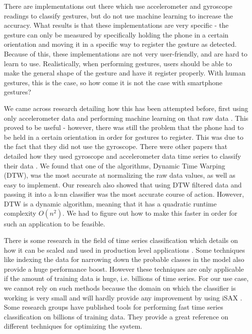 \documentclass{sigchi}
\begin{document}
There are implementations out there which use accelerometer and gyroscope readings to classify gestures, but do not use machine learning to increase the accuracy. What results is that these implementations are very specific - the gesture can only be measured by specifically holding the phone in a certain orientation and moving it in a specific way to register the gesture as detected. Because of this, these implementations are not very user-friendly, and are hard to learn to use. Realistically, when performing gestures, users should be able to make the general shape of the gesture and have it register properly. With human gestures, this is the case, so how come it is not the case with smartphone gestures?

We came across research detailing how this has been attempted before, first using only accelerometer data and performing machine learning on that raw data \cite{uwave}. This proved to be useful - however, there was still the problem that the phone had to be held in a certain orientation in order for gestures to register. This was due to the fact that they did not use the gyroscope. There were other papers that detailed how they used gyroscope and accelerometer data time series to classify their data \cite{combining-data}. We found that one of the algorithms, Dynamic Time Warping (DTW), was the most accurate at normalizing the raw data values, as well as easy to implement. Our research also showed that using DTW filtered data and passing it into a k-nn classifier was the most accurate course of action. However, DTW is a dynamic algorithm, meaning that it has a quadratic runtime complexity \(O(n^2)\). We had to figure out how to make this faster in order for such an application to be feasible. 

There is some research in the field of time series classification which details on how it can be scaled and used in production level applications \cite{scaling-dtw}. Some techniques like indexing the data for narrowing down the probable classes in the model also provide a huge performance boost. However these techniques are only applicable if the amount of training data is huge, i.e. billions of time series. For our use case, we cannot rely on such methods because the domain on which the classifier is working is very small and will hardly provide any improvement by using iSAX \cite{isax}. Some research groups have published tools \cite{ucr-suite} for performing fast time series classification on billions of training data. They provide a great reference on different techniques for optimizing the system.
\end{document}
